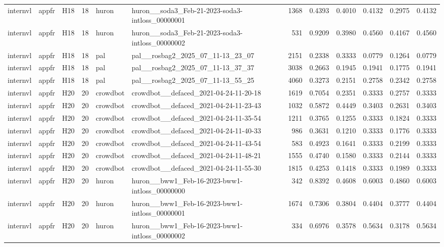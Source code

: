\begin{table}[tbp]
\begin{tabular}{lllrllrrrrrr}
internvl & appfr & H18 & 18 & huron & huron\_\_soda3\_Feb-21-2023-soda3-intloss\_00000001 & 1368 & 0.4393 & 0.4010 & 0.4132 & 0.2975 & 0.4132 \\
internvl & appfr & H18 & 18 & huron & huron\_\_soda3\_Feb-21-2023-soda3-intloss\_00000002 & 531 & 0.9209 & 0.3980 & 0.4560 & 0.4167 & 0.4560 \\
internvl & appfr & H18 & 18 & pal & pal\_\_rosbag2\_2025\_07\_11-13\_23\_07 & 2151 & 0.2338 & 0.3333 & 0.0779 & 0.1264 & 0.0779 \\
internvl & appfr & H18 & 18 & pal & pal\_\_rosbag2\_2025\_07\_11-13\_37\_37 & 3038 & 0.2663 & 0.1945 & 0.1941 & 0.1775 & 0.1941 \\
internvl & appfr & H18 & 18 & pal & pal\_\_rosbag2\_2025\_07\_11-13\_55\_25 & 4060 & 0.3273 & 0.2151 & 0.2758 & 0.2342 & 0.2758 \\
internvl & appfr & H20 & 20 & crowdbot & crowdbot\_\_defaced\_2021-04-24-11-20-18 & 1619 & 0.7054 & 0.2351 & 0.3333 & 0.2757 & 0.3333 \\
internvl & appfr & H20 & 20 & crowdbot & crowdbot\_\_defaced\_2021-04-24-11-23-43 & 1032 & 0.5872 & 0.4449 & 0.3403 & 0.2631 & 0.3403 \\
internvl & appfr & H20 & 20 & crowdbot & crowdbot\_\_defaced\_2021-04-24-11-35-54 & 1211 & 0.3765 & 0.1255 & 0.3333 & 0.1824 & 0.3333 \\
internvl & appfr & H20 & 20 & crowdbot & crowdbot\_\_defaced\_2021-04-24-11-40-33 & 986 & 0.3631 & 0.1210 & 0.3333 & 0.1776 & 0.3333 \\
internvl & appfr & H20 & 20 & crowdbot & crowdbot\_\_defaced\_2021-04-24-11-43-54 & 583 & 0.4923 & 0.1641 & 0.3333 & 0.2199 & 0.3333 \\
internvl & appfr & H20 & 20 & crowdbot & crowdbot\_\_defaced\_2021-04-24-11-48-21 & 1555 & 0.4740 & 0.1580 & 0.3333 & 0.2144 & 0.3333 \\
internvl & appfr & H20 & 20 & crowdbot & crowdbot\_\_defaced\_2021-04-24-11-55-30 & 1815 & 0.4253 & 0.1418 & 0.3333 & 0.1989 & 0.3333 \\
internvl & appfr & H20 & 20 & huron & huron\_\_bww1\_Feb-16-2023-bww1-intloss\_00000000 & 342 & 0.8392 & 0.4608 & 0.6003 & 0.4860 & 0.6003 \\
internvl & appfr & H20 & 20 & huron & huron\_\_bww1\_Feb-16-2023-bww1-intloss\_00000001 & 1674 & 0.7306 & 0.3804 & 0.4404 & 0.3777 & 0.4404 \\
internvl & appfr & H20 & 20 & huron & huron\_\_bww1\_Feb-16-2023-bww1-intloss\_00000002 & 334 & 0.6976 & 0.3578 & 0.5634 & 0.3178 & 0.5634 \\

\end{tabular}
\end{table}
